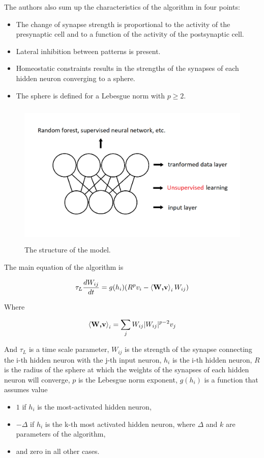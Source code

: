 \documentclass[a4paper]{report}
\begin{document}
The authors also sum up the characteristics of the algorithm  in four points:
\begin{itemize}
	\item The change of synapse strength is proportional to the activity of the presynaptic cell and to a function of the activity of the postsynaptic cell.
	\item Lateral inhibition between patterns is present.
	\item Homeostatic constraints results in the strengths of the synapses of each hidden neuron converging to a sphere.
	\item The sphere is defined for a Lebesgue norm with $p \geq 2$.
\end{itemize}

\begin{figure} [H]
\centering
\includegraphics [height=7cm ,width=12cm ] {o/2parti2.png}
\caption{The structure of the model.}
\end{figure}

The main equation of the algorithm is

\begin{equation}
    \tau_L \frac{dW_{ij}}{dt} = g(h_i)(R^p v_i - \braket{\textbf{W,v}}_i W_{ij} )
    \label{main}
\end{equation}

Where

\begin{equation}
    \braket{\textbf{W,v}}_i = \sum_j W_{ij} |W_{ij}|^{p-2} v_j
\end{equation}

And $\tau_L$ is a time scale parameter,  $W_{ij}$ is the strength of the synapse connecting the i-th hidden neuron with the j-th input neuron, $h_i$ is the i-th hidden neuron, $R$ is the radius of the sphere at which the weights of the synapses of each hidden neuron will converge, $p$ is the Lebesgue norm exponent, $g(h_i)$ is a function that assumes value
\begin{itemize}
    \item $1$ if $h_i$ is the most-activated hidden neuron,
    \item $-\Delta$ if $h_i$ is the k-th most activated hidden neuron, where $\Delta$ and $k$ are parameters of the algorithm,
    \item and zero in all other cases.
\end{itemize}
\end{document}
